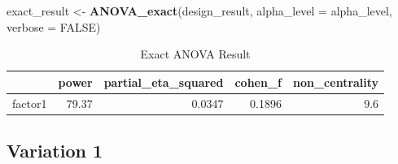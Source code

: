 \documentclass[]{book}
\newenvironment{Shaded}{\begin{snugshade}}{\end{snugshade}}
\newcommand{\DataTypeTok}[1]{\textcolor[rgb]{0.13,0.29,0.53}{#1}}
\newcommand{\KeywordTok}[1]{\textcolor[rgb]{0.13,0.29,0.53}{\textbf{#1}}}
\newcommand{\NormalTok}[1]{#1}
\newcommand{\OtherTok}[1]{\textcolor[rgb]{0.56,0.35,0.01}{#1}}
\newcommand{\StringTok}[1]{\textcolor[rgb]{0.31,0.60,0.02}{#1}}
\begin{document}
\begin{Shaded}
\begin{Highlighting}[]
\NormalTok{exact_result <-}\StringTok{ }\KeywordTok{ANOVA_exact}\NormalTok{(design_result,}
                            \DataTypeTok{alpha_level =}\NormalTok{ alpha_level,}
                            \DataTypeTok{verbose =} \OtherTok{FALSE}\NormalTok{)}
\end{Highlighting}
\end{Shaded}

\begin{table}[t]

\caption{\label{tab:unnamed-chunk-45}Exact ANOVA Result}
\centering
\begin{tabular}{l|r|r|r|r}
\hline
  & power & partial\_eta\_squared & cohen\_f & non\_centrality\\
\hline
factor1 & 79.37 & 0.0347 & 0.1896 & 9.6\\
\hline
\end{tabular}
\end{table}

\hypertarget{variation-1}{%
\subsection{Variation 1}\label{variation-1}}
\end{document}

